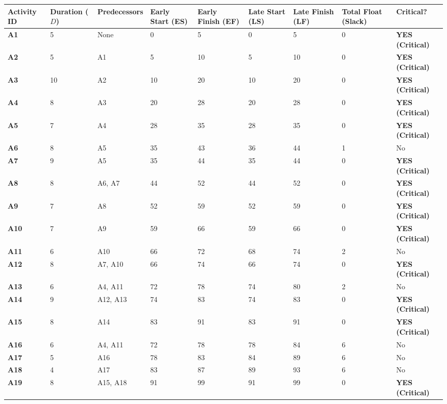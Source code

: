 \documentclass[12pt,a4paper,oneside]{report}
\begin{document}
\begin{table}[htbp]
\centering
\small
\begin{tabularx}{\textwidth}{p{2.5cm} X X X X X X X X}
\toprule
\textbf{Activity ID} & \textbf{Duration ($D$)} & \textbf{Predecessors} & \textbf{Early Start (ES)} & \textbf{Early Finish (EF)} & \textbf{Late Start (LS)} & \textbf{Late Finish (LF)} & \textbf{Total Float (Slack)} & \textbf{Critical?} \\
\midrule
\textbf{A1} & 5 & None & 0 & 5 & 0 & 5 & 0 & \textbf{YES (Critical)} \\
\textbf{A2} & 5 & A1 & 5 & 10 & 5 & 10 & 0 & \textbf{YES (Critical)} \\
\textbf{A3} & 10 & A2 & 10 & 20 & 10 & 20 & 0 & \textbf{YES (Critical)} \\
\textbf{A4} & 8 & A3 & 20 & 28 & 20 & 28 & 0 & \textbf{YES (Critical)} \\
\textbf{A5} & 7 & A4 & 28 & 35 & 28 & 35 & 0 & \textbf{YES (Critical)} \\
\textbf{A6} & 8 & A5 & 35 & 43 & 36 & 44 & 1 & No \\
\textbf{A7} & 9 & A5 & 35 & 44 & 35 & 44 & 0 & \textbf{YES (Critical)} \\
\textbf{A8} & 8 & A6, A7 & 44 & 52 & 44 & 52 & 0 & \textbf{YES (Critical)} \\
\textbf{A9} & 7 & A8 & 52 & 59 & 52 & 59 & 0 & \textbf{YES (Critical)} \\
\textbf{A10} & 7 & A9 & 59 & 66 & 59 & 66 & 0 & \textbf{YES (Critical)} \\
\textbf{A11} & 6 & A10 & 66 & 72 & 68 & 74 & 2 & No \\
\textbf{A12} & 8 & A7, A10 & 66 & 74 & 66 & 74 & 0 & \textbf{YES (Critical)} \\
\textbf{A13} & 6 & A4, A11 & 72 & 78 & 74 & 80 & 2 & No \\
\textbf{A14} & 9 & A12, A13 & 74 & 83 & 74 & 83 & 0 & \textbf{YES (Critical)} \\
\textbf{A15} & 8 & A14 & 83 & 91 & 83 & 91 & 0 & \textbf{YES (Critical)} \\
\textbf{A16} & 6 & A4, A11 & 72 & 78 & 78 & 84 & 6 & No \\
\textbf{A17} & 5 & A16 & 78 & 83 & 84 & 89 & 6 & No \\
\textbf{A18} & 4 & A17 & 83 & 87 & 89 & 93 & 6 & No \\
\textbf{A19} & 8 & A15, A18 & 91 & 99 & 91 & 99 & 0 & \textbf{YES (Critical)} \\
\bottomrule
\end{tabularx}
\end{table}
\end{document}
